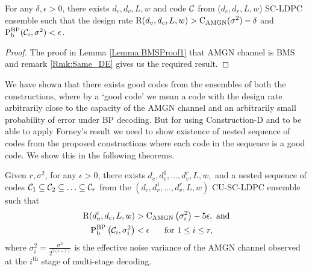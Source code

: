 \begin{lemma}\label{Lemma:BMSProof2}
For any $\delta ,\epsilon>0$, there exists $d_{c},d_{v},L,w$ and code $\mathcal{C}$ from ($d_{c},d_{v},L,w$) SC-LDPC  ensemble such that the design rate $\text{R}(d_{v},d_{c},L,w)>\text{C}_{\text{AMGN}}(\sigma^{2})-\delta$ and $\text{P}_{\text{b}}^{\text{BP}}(\mathcal{C}_{i},\sigma^{2})< \epsilon$.

\end{lemma}
\begin{proof}
The proof in Lemma \ref{Lemma:BMSProof1} that AMGN channel is BMS and remark \ref{Rmk:Same_DE} gives us the required result.
\end{proof}

We have shown that there exists good codes from the ensembles of both the constructions, where by a `good code' we mean a code with the design rate arbitrarily close to the capacity of the AMGN channel and an arbitrarily small probability of error under BP decoding. But for using Construction-D and to be able to apply Forney's result we need to show existence of nested sequence of codes from the proposed constructions where each code in the sequence is a good code. We show this in the following theorems.

\begin{lemma}\label{Lemma:NestedGoodCodes1}
Given $r,\sigma^{2}$, for any $\epsilon>0$, there exists $d_{c},d_{v}^{1},\ldots, d_{v}^{r},L,w,$ and a nested sequence of codes $\mathcal{C}_{1}\subseteq \mathcal{C}_{2}\subseteq\ldots \subseteq\mathcal{C}_{r}$ from the $(d_{c},d_{v}^{1},\ldots,d_{v}^{r},L,w)$ CU-SC-LDPC ensemble such that 
\begin{align}
\text{R}(d_{v}^{i},d_{c},L,w)&>\text{C}_{\text{AMGN}}\left(\sigma^{2}_{i}\right)-5\epsilon, \text{ and} \label{Eqn:RateConditions1}\\
\text{P}_{\text{b}}^{\text{BP}}\left(\mathcal{C}_{i},\sigma^{2}_{i}\right)&<\epsilon \hspace{0.5cm}\text{ for }1\leq i \leq r\label{Eqn:Error Prob1},
\end{align}
where $\sigma_{i}^{2}=\frac{\sigma^{2}}{2^{2(i-1)}}$ is the effective noise variance of the AMGN channel observed 	at the $i^{\text{th}}$ stage of multi-stage decoding.
\end{lemma}

